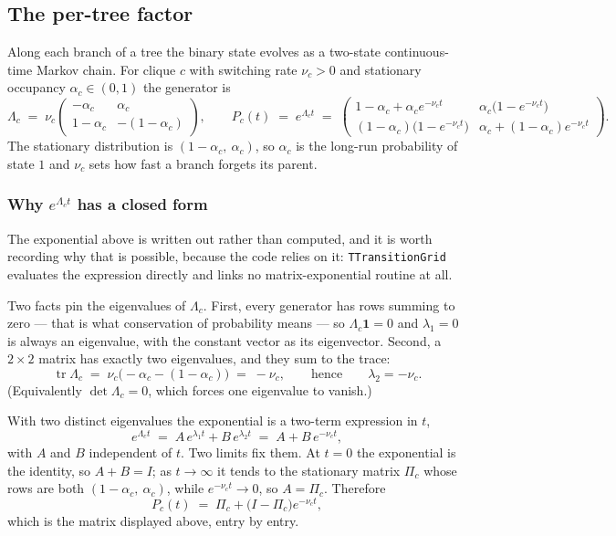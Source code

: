 \documentclass[11pt,a4paper]{article}
\begin{document}
\subsection{The per-tree factor}

Along each branch of a tree the binary state evolves as a two-state continuous-time Markov
chain. For clique $c$ with switching rate $\nu_c > 0$ and stationary occupancy
$\alpha_c \in (0,1)$ the generator is
\[
  \Lambda_c \;=\; \nu_c
  \begin{pmatrix}
    -\alpha_c & \alpha_c\\[2pt]
    1-\alpha_c & -(1-\alpha_c)
  \end{pmatrix},
  \qquad
  P_c(t) \;=\; e^{\Lambda_c t}
  \;=\;
  \begin{pmatrix}
    1-\alpha_c + \alpha_c e^{-\nu_c t} & \alpha_c\bigl(1 - e^{-\nu_c t}\bigr)\\[2pt]
    (1-\alpha_c)\bigl(1 - e^{-\nu_c t}\bigr) & \alpha_c + (1-\alpha_c) e^{-\nu_c t}
  \end{pmatrix}.
\]
The stationary distribution is $(1-\alpha_c,\ \alpha_c)$, so $\alpha_c$ is the long-run
probability of state $1$ and $\nu_c$ sets how fast a branch forgets its parent.

\subsubsection*{Why $e^{\Lambda_c t}$ has a closed form}
\label{sec:closedform}

The exponential above is written out rather than computed, and it is worth recording why that
is possible, because the code relies on it: \texttt{TTransitionGrid} evaluates the expression
directly and links no matrix-exponential routine at all.

Two facts pin the eigenvalues of $\Lambda_c$. First, every generator has rows summing to zero
--- that is what conservation of probability means --- so $\Lambda_c \mathbf{1} = 0$ and
$\lambda_1 = 0$ is always an eigenvalue, with the constant vector as its eigenvector. Second, a
$2 \times 2$ matrix has exactly two eigenvalues, and they sum to the trace:
\[
  \operatorname{tr} \Lambda_c
  \;=\; \nu_c\bigl(-\alpha_c - (1-\alpha_c)\bigr)
  \;=\; -\nu_c ,
  \qquad\text{hence}\qquad
  \lambda_2 = -\nu_c .
\]
(Equivalently $\det \Lambda_c = 0$, which forces one eigenvalue to vanish.)

With two distinct eigenvalues the exponential is a two-term expression in $t$,
\[
  e^{\Lambda_c t} \;=\; A\,e^{\lambda_1 t} + B\,e^{\lambda_2 t}
  \;=\; A + B\,e^{-\nu_c t},
\]
with $A$ and $B$ independent of $t$. Two limits fix them. At $t = 0$ the exponential is the
identity, so $A + B = I$; as $t \to \infty$ it tends to the stationary matrix $\Pi_c$ whose
rows are both $(1-\alpha_c,\ \alpha_c)$, while $e^{-\nu_c t} \to 0$, so $A = \Pi_c$. Therefore
\begin{equation}
  P_c(t) \;=\; \Pi_c + \bigl(I - \Pi_c\bigr) e^{-\nu_c t},
  \label{eq:closedform}
\end{equation}
which is the matrix displayed above, entry by entry.
\end{document}
